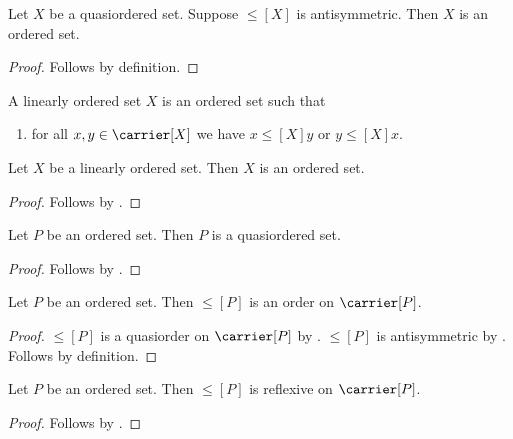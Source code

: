 \begin{proposition}\label{ordered_set_intro}
    Let $X$ be a quasiordered set.
    Suppose $\leq[X]$ is antisymmetric.
    Then $X$ is an ordered set.
\end{proposition}
\begin{proof}
    Follows by definition.
\end{proof}

\begin{struct}\label{linearly_ordered_set}
    A linearly ordered set $X$ is an ordered set such that
    \begin{enumerate}
        \item\label{linearly_ordered_set_total}
            for all $x,y\in\carrier[X]$ we have
                $x\mathrel{\leq[X]}y$ or $y\mathrel{\leq[X]}x$.
    \end{enumerate}
\end{struct}

\begin{classification}\label{linearly_ordered_set_is_ordered_set}
    Let $X$ be a linearly ordered set.
    Then $X$ is an ordered set.
\end{classification}
\begin{proof}
    Follows by .
\end{proof}

\begin{proposition}\label{ordered_set_is_quasiordered_set}
    Let $P$ be an ordered set.
    Then $P$ is a quasiordered set.
\end{proposition}
\begin{proof}
    Follows by .
\end{proof}

\begin{proposition}\label{ordered_set_order_on_carrier}
    Let $P$ be an ordered set.
    Then $\leq[P]$ is an order on $\carrier[P]$.
\end{proposition}
\begin{proof}
    $\leq[P]$ is a quasiorder on $\carrier[P]$ by
        .
    $\leq[P]$ is antisymmetric by .
    Follows by definition.
\end{proof}

\begin{proposition}\label{ordered_set_order_reflexive}
    Let $P$ be an ordered set.
    Then $\leq[P]$ is reflexive on $\carrier[P]$.
\end{proposition}
\begin{proof}
    Follows by .
\end{proof}

